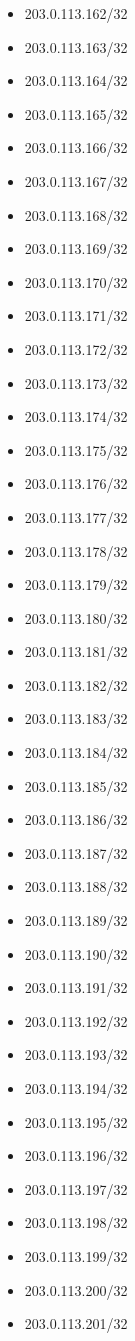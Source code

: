 \documentclass[a4paper,10pt]{article}
\begin{document}
\begin{itemize}
  \item 203.0.113.162/32
  \item 203.0.113.163/32
  \item 203.0.113.164/32
  \item 203.0.113.165/32
  \item 203.0.113.166/32
  \item 203.0.113.167/32
  \item 203.0.113.168/32
  \item 203.0.113.169/32
  \item 203.0.113.170/32
  \item 203.0.113.171/32
  \item 203.0.113.172/32
  \item 203.0.113.173/32
  \item 203.0.113.174/32
  \item 203.0.113.175/32
  \item 203.0.113.176/32
  \item 203.0.113.177/32
  \item 203.0.113.178/32
  \item 203.0.113.179/32
  \item 203.0.113.180/32
  \item 203.0.113.181/32
  \item 203.0.113.182/32
  \item 203.0.113.183/32
  \item 203.0.113.184/32
  \item 203.0.113.185/32
  \item 203.0.113.186/32
  \item 203.0.113.187/32
  \item 203.0.113.188/32
  \item 203.0.113.189/32
  \item 203.0.113.190/32
  \item 203.0.113.191/32
  \item 203.0.113.192/32
  \item 203.0.113.193/32
  \item 203.0.113.194/32
  \item 203.0.113.195/32
  \item 203.0.113.196/32
  \item 203.0.113.197/32
  \item 203.0.113.198/32
  \item 203.0.113.199/32
  \item 203.0.113.200/32
  \item 203.0.113.201/32

\end{itemize}
\end{document}

